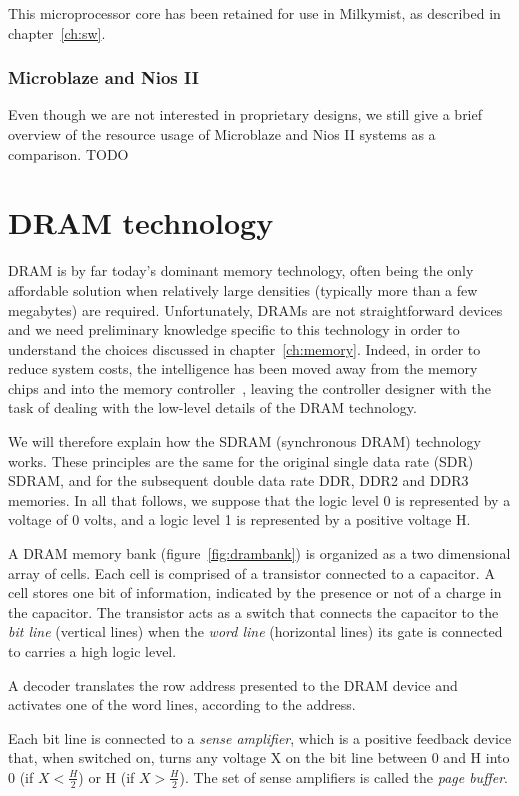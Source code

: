 \documentclass[a4paper,11pt]{kthesis}
\begin{document}
This microprocessor core has been retained for use in Milkymist, as described in chapter~\ref{ch:sw}.

\subsubsection{Microblaze and Nios II}
Even though we are not interested in proprietary designs, we still give a brief overview of the resource usage of Microblaze and Nios II systems as a comparison.
TODO

\section{DRAM technology}
DRAM is by far today's dominant memory technology, often being the only affordable solution when relatively large densities (typically more than a few megabytes) are required. Unfortunately, DRAMs are not straightforward devices and we need preliminary knowledge specific to this technology in order to understand the choices discussed in chapter~\ref{ch:memory}. Indeed, in order to reduce system costs, the intelligence has been moved away from the memory chips and into the memory controller~\cite{dramlowcost}, leaving the controller designer with the task of dealing with the low-level details of the DRAM technology.

We will therefore explain how the SDRAM (synchronous DRAM) technology works. These principles are the same for the original single data rate (SDR) SDRAM, and for the subsequent double data rate DDR, DDR2 and DDR3 memories. In all that follows, we suppose that the logic level 0 is represented by a voltage of 0 volts, and a logic level 1 is represented by a positive voltage H.

A DRAM memory bank (figure~\ref{fig:drambank}) is organized as a two dimensional array of cells. Each cell is comprised of a transistor connected to a capacitor. A cell stores one bit of information, indicated by the presence or not of a charge in the capacitor. The transistor acts as a switch that connects the capacitor to the \textit{bit line} (vertical lines) when the \textit{word line} (horizontal lines) its gate is connected to carries a high logic level.

A decoder translates the row address presented to the DRAM device and activates one of the word lines, according to the address.

Each bit line is connected to a \textit{sense amplifier}, which is a positive feedback device that, when switched on, turns any voltage X on the bit line between 0 and H into 0 (if $X < \frac{H}{2}$) or H (if $X > \frac{H}{2}$). The set of sense amplifiers is called the \textit{page buffer}.
\end{document}
